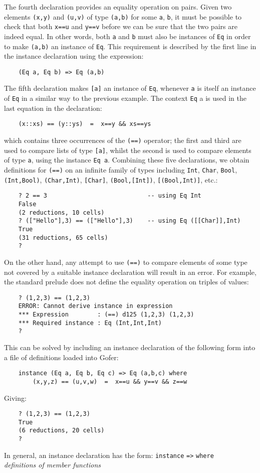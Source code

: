 \IT  The fourth declaration provides an equality  operation  on  pairs.
     Given two elements \verb"(x,y)" and \verb"(u,v)" 
     of type \verb"(a,b)" for some \verb"a", \verb"b", it
     must be possible to check that both \verb"x==u" and \verb"y==v" 
     before we can be
     sure that the two pairs are indeed equal.  In other words, both  \verb"a"
     and \verb"b" must also be instances of \verb"Eq"  
     in  order  to  make  \verb"(a,b)"  an
     instance of \verb"Eq".  This requirement is described by the  first  line
     in the instance declaration using the expression:
\begin{verbatim}
    (Eq a, Eq b) => Eq (a,b)
\end{verbatim}

\IT  The fifth declaration makes \verb"[a]" an instance of \verb"Eq", 
     whenever  \verb"a"  is
     itself an instance  of  \verb"Eq"  in  a  similar  way  to  the  previous
     example.  The context \verb"Eq" a is used in the  last  equation  in  the
     declaration:
\begin{verbatim}
    (x::xs) == (y::ys)  =  x==y && xs==ys
\end{verbatim}
     which contains three occurrences of the \verb"(==)" operator;  the  first
     and third are used to compare lists of type \verb"[a]", whilst the second
     is used to compare elements of type \verb"a", using the 
     instance \verb"Eq a".
\EI
Combining these five declarations, we obtain definitions for \verb"(==)" on an
infinite  family  of  types  including  
\verb"Int",  \verb"Char",  \verb"Bool",  \verb"(Int,Bool)",
\verb"(Char,Int)", \verb"[Char]", 
\verb"(Bool,[Int])", \verb"[(Bool,Int)]", etc.:
\begin{verbatim}
    ? 2 == 3                            -- using Eq Int
    False
    (2 reductions, 10 cells)
    ? (["Hello"],3) == (["Hello"],3)    -- using Eq ([[Char]],Int)
    True
    (31 reductions, 65 cells)
    ?
\end{verbatim}
On the other hand, any attempt to use \verb"(==)" to compare elements of  some
type not covered by a suitable instance declaration will result  in  an
error.  For example, the standard prelude does not define the  equality
operation on triples of values:
\begin{verbatim}
    ? (1,2,3) == (1,2,3)
    ERROR: Cannot derive instance in expression
    *** Expression        : (==) d125 (1,2,3) (1,2,3)
    *** Required instance : Eq (Int,Int,Int)
    ?
\end{verbatim}
This can be solved by including an instance  declaration  of  the  following form
into a file of definitions loaded into Gofer:
\begin{verbatim}
    instance (Eq a, Eq b, Eq c) => Eq (a,b,c) where
        (x,y,z) == (u,v,w)  =  x==u && y==v && z==w
\end{verbatim}
Giving:
\begin{verbatim}
    ? (1,2,3) == (1,2,3)
    True
    (6 reductions, 20 cells)
    ?
\end{verbatim}
In general, an instance declaration has the form:
\BQ
    \verb"instance"   \verb"=>"   \verb"where"\\
    {\em definitions of member functions}
\EQ

